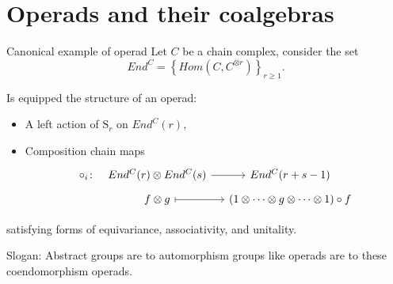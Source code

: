 \documentclass[10pt,t, handout]{beamer} %
\renewcommand{\S}{\mathrm{S}}
\begin{document}
\section{Operads and their coalgebras}

\begin{frame}[fragile]{Canonical example of operad}
	Let $C$ be a chain complex, consider the set
	\begin{equation*}
	End^C = \left\{Hom(C, C^{\otimes r})\right\}_{r \geq 1}.
	\end{equation*}
	
	\pause
	
	Is equipped the structure of an operad:
	\begin{itemize}
		\item A left action of $\S_r$ on $End^C(r)$,
		\item Composition chain maps
		\begin{equation*}
		\begin{tikzcd}[column sep=small, row sep=tiny]
		\circ_i \colon &[-10pt] End^C(r) \otimes End^C(s) \arrow[r] & End^C(r+s-1) \\
		& f \otimes g \arrow[r, |->] & (1 \otimes \cdots \otimes g \otimes \cdots \otimes 1) \circ f 
		\end{tikzcd}
		\end{equation*}
	\end{itemize}
	satisfying forms of equivariance, associativity, and unitality.
	
	\pause \vspace*{10pt}
	
	\textcolor{pblue}{Slogan:} Abstract groups are to automorphism groups like operads are to these coendomorphism operads.
\end{frame}
\end{document}
